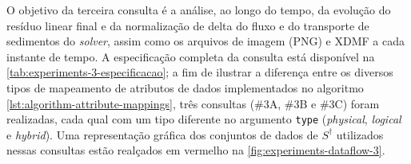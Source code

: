 %
%
%
%

O objetivo da terceira consulta é a análise, ao longo do tempo, da evolução do resíduo linear final e da normalização de delta do fluxo e do transporte de sedimentos do \textit{solver}, assim como os arquivos de imagem (PNG) e XDMF a cada instante de tempo. A especificação completa da consulta está disponível na \autoref{tab:experiments-3-especificacao}; a fim de ilustrar a diferença entre os diversos tipos de mapeamento de atributos de dados implementados no algoritmo \autoref{lst:algorithm-attribute-mappings}, três consultas (\#3A, \#3B e \#3C) foram realizadas, cada qual com um tipo diferente no argumento \texttt{type} (\textit{physical}, \textit{logical} e \textit{hybrid}). Uma representação gráfica dos conjuntos de dados de \(S^{\dagger}\) utilizados nessas consultas estão realçados em vermelho na \autoref{fig:experiments-dataflow-3}.

